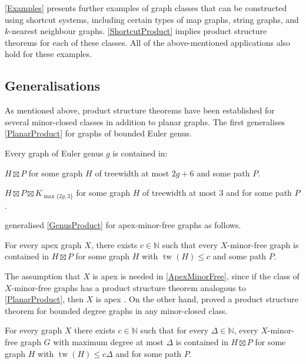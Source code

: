 \documentclass{patmorin}
\DeclareMathOperator{\tw}{tw}
\renewcommand{\leq}{\leqslant}
\begin{document}
\cref{Examples} presents further examples of graph classes that can be constructed using shortcut systems, including certain types of map graphs, string graphs, and $k$-nearest neighbour graphs. \cref{ShortcutProduct} implies product structure theorems for each of these classes. All of the above-mentioned applications also hold for these examples.

\subsection{Generalisations}
\label{Generalisations}

As mentioned above, product structure theorems have been established for several minor-closed classes in addition to planar graphs. The first generalises \cref{PlanarProduct} for graphs of bounded Euler genus.

\begin{thm}
\label{GenusProduct}
Every graph of Euler genus $g$ is contained in:
\begin{compactenum}[(a)]
\item $H  \boxtimes P$ for some graph $H$ of treewidth at most $2g+6$  and some path $P$.
\item $H \boxtimes P \boxtimes K_{\max\{2g,3\}}$ for some graph $H$ of treewidth at most $3$ and for some path $P$.
\end{compactenum}
\end{thm}

\citet{DJMMUW20} generalised \cref{GenusProduct} for apex-minor-free graphs as follows.

\begin{thm}
	\label{ApexMinorFree}
	For every apex graph $X$, there exists $c\in\mathbb{N}$ such that every $X$-minor-free graph is contained in $H\boxtimes P$ for some graph $H$ with $\tw(H)\leq c$ and some path $P$.
\end{thm}

The assumption that $X$ is apex is needed in \cref{ApexMinorFree}, since if the class of $X$-minor-free graphs has a product structure theorem analogous to \cref{PlanarProduct}, then $X$ is apex \citep{DJMMUW20}. On the other hand, \citet{DEMWW22} proved a product structure theorem for bounded degree graphs in any minor-closed class.

\begin{thm}
	\label{MinorFreeDegree}
	For every graph $X$ there exists $c\in\mathbb{N}$ such that for every $\Delta\in\mathbb{N}$, every $X$-minor-free graph $G$ with maximum degree at most $\Delta$ is contained in $H\boxtimes P$ for some graph $H$ with $\tw(H) \leq c\Delta$ and for some path $P$.
\end{thm}
\end{document}
